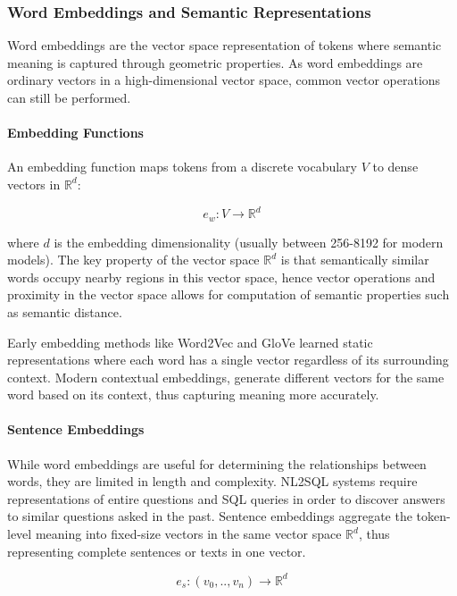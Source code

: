 \subsubsection{Word Embeddings and Semantic Representations}

Word embeddings are the vector space representation of tokens where semantic
meaning is captured through geometric properties. As word embeddings are
ordinary vectors in a high-dimensional vector space, common vector operations
can still be performed.

\paragraph{Embedding Functions}

An embedding function maps tokens from a discrete vocabulary $V$ to dense
vectors in $\mathbb{R}^d$:

\begin{equation}
e_{w}: V \rightarrow \mathbb{R}^d
\end{equation}

where $d$ is the embedding dimensionality (usually between 256-8192 for modern
models). The key property of the vector space $\mathbb{R}^d$ is that
semantically similar words occupy nearby regions in this vector space, hence
vector operations and proximity in the vector space allows for computation of
semantic properties such as semantic distance.

Early embedding methods like Word2Vec and GloVe learned static representations
where each word has a single vector regardless of its surrounding context.
Modern contextual embeddings, generate different vectors for the same word
based on its context, thus capturing meaning more accurately.

\paragraph{Sentence Embeddings}

While word embeddings are useful for determining the relationships between
words, they are limited in length and complexity. NL2SQL systems require
representations of entire questions and SQL queries in order to discover
answers to similar questions asked in the past. Sentence embeddings aggregate
the token-level meaning into fixed-size vectors in the same vector space
$\mathbb{R}^d$, thus representing complete sentences or texts in one vector.

\begin{equation}
    e_{s}: (v_0, .., v_n) \rightarrow \mathbb{R}^d
\end{equation}

